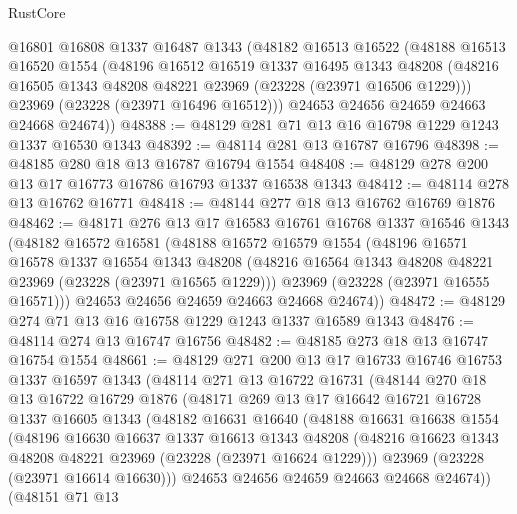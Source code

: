 \begin{lexlean}{RustCore}
\begin{coremodule}
    @16801
    @16808
    @1337
    @16487
    @1343
    (@48182
      @16513
      @16522
      (@48188
        @16513
        @16520
        @1554
        (@48196
          @16512
          @16519
          @1337
          @16495
          @1343
          @48208
          (@48216 @16505 @1343 @48208 @48221 @23969 (@23228 (@23971 @16506 @1229)))
          @23969
          (@23228 (@23971 @16496 @16512)))
        @24653
        @24656
        @24659
        @24663
        @24668
        @24674))
@48388 := @48129 @281 @71 @13 @16 @16798 @1229 @1243 @1337 @16530 @1343
@48392 := @48114 @281 @13 @16787 @16796
@48398 := @48185 @280 @18 @13 @16787 @16794 @1554
@48408 := @48129 @278 @200 @13 @17 @16773 @16786 @16793 @1337 @16538 @1343
@48412 := @48114 @278 @13 @16762 @16771
@48418 := @48144 @277 @18 @13 @16762 @16769 @1876
@48462 := @48171
    @276
    @13
    @17
    @16583
    @16761
    @16768
    @1337
    @16546
    @1343
    (@48182
      @16572
      @16581
      (@48188
        @16572
        @16579
        @1554
        (@48196
          @16571
          @16578
          @1337
          @16554
          @1343
          @48208
          (@48216 @16564 @1343 @48208 @48221 @23969 (@23228 (@23971 @16565 @1229)))
          @23969
          (@23228 (@23971 @16555 @16571)))
        @24653
        @24656
        @24659
        @24663
        @24668
        @24674))
@48472 := @48129 @274 @71 @13 @16 @16758 @1229 @1243 @1337 @16589 @1343
@48476 := @48114 @274 @13 @16747 @16756
@48482 := @48185 @273 @18 @13 @16747 @16754 @1554
@48661 := @48129
    @271
    @200
    @13
    @17
    @16733
    @16746
    @16753
    @1337
    @16597
    @1343
    (@48114
      @271
      @13
      @16722
      @16731
      (@48144
        @270
        @18
        @13
        @16722
        @16729
        @1876
        (@48171
          @269
          @13
          @17
          @16642
          @16721
          @16728
          @1337
          @16605
          @1343
          (@48182
            @16631
            @16640
            (@48188
              @16631
              @16638
              @1554
              (@48196
                @16630
                @16637
                @1337
                @16613
                @1343
                @48208
                (@48216 @16623 @1343 @48208 @48221 @23969 (@23228 (@23971 @16624 @1229)))
                @23969
                (@23228 (@23971 @16614 @16630)))
              @24653
              @24656
              @24659
              @24663
              @24668
              @24674))
          (@48151
            @71
            @13

\end{coremodule}
\end{lexlean}
